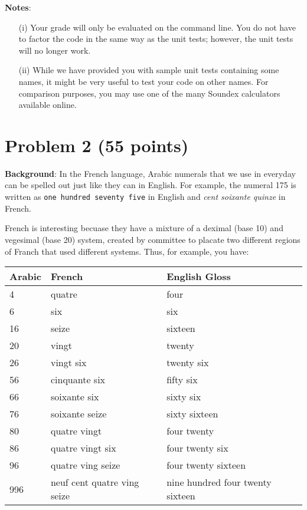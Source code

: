\documentclass[11pt]{article}
\begin{document}
\noindent \textbf{Notes}:
\begin{enumerate}
	\item[(i)] Your grade will only be evaluated on the command
          line.  You do not have to factor the code in the same way as
          the unit tests; however, the unit tests will no longer
          work.

          \item[(ii)] While we have provided you with sample unit
          tests containing some names, it might be very useful to test
          your code on other names. For comparison purposes, you may
          use one of the many Soundex calculators available online.
\end{enumerate}

\section*{Problem 2 (55 points)} %
\label{sec:problem_3}
\textbf{Background}: In the French language, Arabic numerals that we
use in everyday can be spelled out just like they can in English. For
example, the numeral 175 is written as \texttt{one hundred seventy
  five} in English and \textit{cent soixante quinze} in French.

French is interesting becuase they have a mixture of a deximal (base
10) and vegesimal (base 20) system, created by committee to placate
two different regions of Franch that used different systems.  Thus,
for example, you have: \\
\begin{tabular}{|l|l|l|}
\hline
Arabic & French & English Gloss \\
\hline
4 & quatre & four \\
6 & six & six \\
16 & seize & sixteen \\
20 & vingt & twenty \\
26 & vingt six & twenty six \\
56 & cinquante six & fifty six \\
66 & soixante six & sixty six \\
76 & soixante seize & sixty sixteen  \\
80 & quatre vingt & four twenty \\
86 & quatre vingt six & four twenty six \\
96 & quatre ving seize & four twenty sixteen \\
996 & neuf cent quatre ving seize & nine hundred four twenty sixteen
\\
\hline
\end{tabular}
\end{document}
